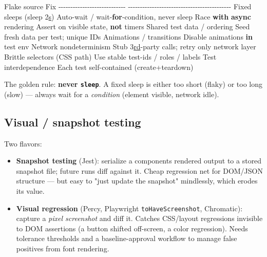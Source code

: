 \documentclass[11pt]{article}
\providecommand{\tightlist}{\setlength{\itemsep}{1pt}\setlength{\parskip}{0pt}}
\newenvironment{Shaded}{\begin{snugshade}}{\end{snugshade}}
\newcommand{\ControlFlowTok}[1]{\textcolor[rgb]{0.99,0.74,0.29}{\textbf{#1}}}
\newcommand{\DecValTok}[1]{\textcolor[rgb]{0.96,0.45,0.00}{#1}}
\newcommand{\ErrorTok}[1]{\textcolor[rgb]{0.85,0.27,0.33}{\underline{#1}}}
\newcommand{\KeywordTok}[1]{\textcolor[rgb]{0.81,0.81,0.76}{\textbf{#1}}}
\newcommand{\NormalTok}[1]{\textcolor[rgb]{0.81,0.81,0.76}{#1}}
\newcommand{\OperatorTok}[1]{\textcolor[rgb]{0.81,0.81,0.76}{#1}}
\newcommand{\VariableTok}[1]{\textcolor[rgb]{0.15,0.68,0.68}{#1}}
\begin{document}
\begin{Shaded}
\begin{Highlighting}[]
\NormalTok{  Flake source                  Fix}
  \OperatorTok{{-}{-}{-}{-}{-}{-}{-}{-}{-}{-}{-}{-}{-}{-}{-}{-}{-}{-}{-}{-}{-}{-}{-}{-}{-}{-}{-}{-}}  \OperatorTok{{-}{-}{-}{-}{-}{-}{-}{-}{-}{-}{-}{-}{-}{-}{-}{-}{-}{-}{-}{-}{-}{-}{-}{-}{-}{-}{-}{-}{-}{-}{-}{-}{-}{-}{-}{-}{-}{-}{-}{-}{-}{-}{-}}
\NormalTok{  Fixed sleeps (sleep }\DecValTok{2}\ErrorTok{s}\NormalTok{)       Auto}\OperatorTok{{-}}\NormalTok{wait }\OperatorTok{/}\NormalTok{ wait}\OperatorTok{{-}}\ControlFlowTok{for}\OperatorTok{{-}}\NormalTok{condition, never sleep}
\NormalTok{  Race }\ControlFlowTok{with} \ControlFlowTok{async}\NormalTok{ rendering     Assert on visible state, }\KeywordTok{not}\NormalTok{ timers}
\NormalTok{  Shared test data }\OperatorTok{/}\NormalTok{ ordering   Seed fresh data per test}\OperatorTok{;}\NormalTok{ unique IDs}
\NormalTok{  Animations }\OperatorTok{/}\NormalTok{ transitions      Disable animations }\KeywordTok{in}\NormalTok{ test env}
\NormalTok{  Network nondeterminism        Stub }\DecValTok{3}\ErrorTok{rd}\OperatorTok{{-}}\NormalTok{party calls}\OperatorTok{;}\NormalTok{ retry only network layer}
\NormalTok{  Brittle selectors (CSS path)  Use stable test}\OperatorTok{{-}}\NormalTok{ids }\OperatorTok{/}\NormalTok{ roles }\OperatorTok{/}\NormalTok{ labels}
\NormalTok{  Test interdependence          Each test }\VariableTok{self}\OperatorTok{{-}}\NormalTok{contained (create}\OperatorTok{+}\NormalTok{teardown)}
\end{Highlighting}
\end{Shaded}

The golden rule: \textbf{never \texttt{sleep}}. A fixed sleep is either too short (flaky) or too long (slow) --- always wait for a \emph{condition} (element visible, network idle).

\subsection{Visual / snapshot testing}\label{visual--snapshot-testing}

Two flavors:

\begin{itemize}
\tightlist
\item
  \textbf{Snapshot testing} (Jest): serialize a component\textquotesingle s rendered output to a stored snapshot file; future runs diff against it. Cheap regression net for DOM/JSON structure --- but easy to "just update the snapshot" mindlessly, which erodes its value.
\item
  \textbf{Visual regression} (Percy, Playwright \texttt{toHaveScreenshot}, Chromatic): capture a \emph{pixel screenshot} and diff it. Catches CSS/layout regressions invisible to DOM assertions (a button shifted off-screen, a color regression). Needs tolerance thresholds and a baseline-approval workflow to manage false positives from font rendering.
\end{itemize}
\end{document}
